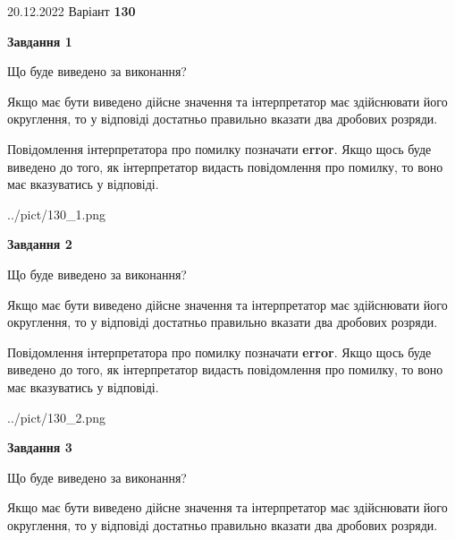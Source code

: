 \documentclass[12pt, ukrainian]{article}
\begin{document}
{20.12.2022 Варіант \No \textbf { 130 }\par}
{
\begin {Large}

{\begin {center}\textbf{Завдання 1}\end {center}}\par
Що буде виведено за виконання? \par

Якщо має бути виведено дійсне значення та інтерпретатор має здійснювати його округлення, 
то у відповіді достатньо правильно вказати два дробових розряди.

Повідомлення інтерпретатора про помилку позначати \textbf{error}.
Якщо щось буде виведено до того, як інтерпретатор видасть повідомлення про помилку, 
то воно має вказуватись у відповіді. \par

\begin{center}
	{../pict/130_1.png}
\end{center}
\newpage

{\begin {center}\textbf{Завдання 2}\end {center}}\par
Що буде виведено за виконання? \par

Якщо має бути виведено дійсне значення та інтерпретатор має здійснювати його округлення, 
то у відповіді достатньо правильно вказати два дробових розряди.

Повідомлення інтерпретатора про помилку позначати \textbf{error}.
Якщо щось буде виведено до того, як інтерпретатор видасть повідомлення про помилку, 
то воно має вказуватись у відповіді. \par

\begin{center}
	{../pict/130_2.png}
\end{center}
\newpage

{\begin {center}\textbf{Завдання 3}\end {center}}\par
Що буде виведено за виконання? \par

Якщо має бути виведено дійсне значення та інтерпретатор має здійснювати його округлення, 
то у відповіді достатньо правильно вказати два дробових розряди.


\end{Large}}
\end{document}
